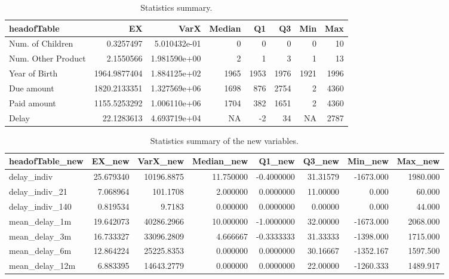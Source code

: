\documentclass[
]{article}
\begin{document}
\begin{table}

\caption{\label{tab:Stats}Statistics summary.}
\centering
\begin{tabular}[t]{l|r|r|r|r|r|r|r}
\hline
headofTable & EX & VarX & Median & Q1 & Q3 & Min & Max\\
\hline
Num. of Children & 0.3257497 & 5.010432e-01 & 0 & 0 & 0 & 0 & 10\\
\hline
Num. Other Product & 2.1550566 & 1.981590e+00 & 2 & 1 & 3 & 1 & 13\\
\hline
Year of Birth & 1964.9877404 & 1.884125e+02 & 1965 & 1953 & 1976 & 1921 & 1996\\
\hline
Due amount & 1820.2133351 & 1.327569e+06 & 1698 & 876 & 2754 & 2 & 4360\\
\hline
Paid amount & 1155.5253292 & 1.006110e+06 & 1704 & 382 & 1651 & 2 & 4360\\
\hline
Delay & 22.1283613 & 4.693719e+04 & NA & -2 & 34 & NA & 2787\\
\hline
\end{tabular}
\end{table}

\begin{table}

\caption{\label{tab:Statss}Statistics summary of the new variables.}
\centering
\begin{tabular}[t]{l|r|r|r|r|r|r|r}
\hline
headofTable\_new & EX\_new & VarX\_new & Median\_new & Q1\_new & Q3\_new & Min\_new & Max\_new\\
\hline
delay\_indiv & 25.679340 & 10196.8875 & 11.750000 & -0.4000000 & 31.31579 & -1673.000 & 1980.000\\
\hline
delay\_indiv\_21 & 7.068964 & 101.1708 & 2.000000 & 0.0000000 & 11.00000 & 0.000 & 60.000\\
\hline
delay\_indiv\_140 & 0.819534 & 9.7183 & 0.000000 & 0.0000000 & 0.00000 & 0.000 & 44.000\\
\hline
mean\_delay\_1m & 19.642073 & 40286.2966 & 10.000000 & -1.0000000 & 32.00000 & -1673.000 & 2068.000\\
\hline
mean\_delay\_3m & 16.733327 & 33096.2809 & 4.666667 & -0.3333333 & 31.33333 & -1398.000 & 1715.000\\
\hline
mean\_delay\_6m & 12.864224 & 25225.8353 & 0.000000 & 0.0000000 & 30.16667 & -1352.167 & 1597.500\\
\hline
mean\_delay\_12m & 6.883395 & 14643.2779 & 0.000000 & 0.0000000 & 22.00000 & -1260.333 & 1489.917\\
\hline
\end{tabular}
\end{table}
\end{document}
